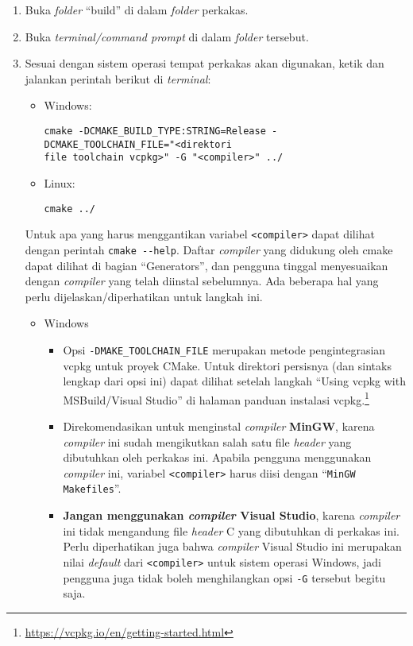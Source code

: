 \begin{enumerate}
	\item Buka \textit{folder} ``build'' di dalam \textit{folder} perkakas.
	\item Buka \textit{terminal/command prompt} di dalam \textit{folder} tersebut.
	\item Sesuai dengan sistem operasi tempat perkakas akan digunakan, ketik dan jalankan perintah berikut di \textit{terminal}:
	
	\begin{itemize}
		\item Windows:
		\begin{verbatim}
cmake -DCMAKE_BUILD_TYPE:STRING=Release -DCMAKE_TOOLCHAIN_FILE="<direktori
file toolchain vcpkg>" -G "<compiler>" ../
		\end{verbatim}
	
		\item Linux:
		\begin{verbatim}
cmake ../
		\end{verbatim}
	\end{itemize}		

	Untuk apa yang harus menggantikan variabel \verb|<compiler>| dapat dilihat dengan \mbox{perintah} \verb|cmake --help|. Daftar \textit{compiler} yang didukung oleh cmake dapat dilihat di bagian \linebreak ``Generators'', dan pengguna tinggal menyesuaikan dengan \textit{compiler} yang telah diinstal sebelumnya.  Ada beberapa hal yang perlu dijelaskan/diperhatikan untuk langkah ini.
	
	\begin{itemize}
		\item Windows
			
		\begin{itemize}
			\item Opsi \verb|-DMAKE_TOOLCHAIN_FILE| merupakan metode pengintegrasian vcpkg untuk proyek CMake. Untuk direktori persisnya (dan sintaks lengkap dari opsi ini) dapat dilihat setelah langkah ``Using vcpkg with MSBuild/Visual Studio'' di halaman panduan instalasi vcpkg.\footnote{\href{https://vcpkg.io/en/getting-started.html}{https://vcpkg.io/en/getting-started.html}}
			\item Direkomendasikan untuk menginstal \textit{compiler} \textbf{MinGW}, karena \textit{compiler} ini sudah mengikutkan salah satu file \textit{header} yang dibutuhkan oleh perkakas ini. Apabila pengguna menggunakan \textit{compiler} ini, variabel \verb|<compiler>| harus diisi dengan ``\verb|MinGW Makefiles|''.
			\item \textbf{Jangan menggunakan \textit{compiler} Visual Studio}, karena \textit{compiler} ini tidak mengandung file \textit{header} C yang dibutuhkan di perkakas ini. Perlu diperhatikan juga bahwa \textit{compiler} Visual Studio ini merupakan nilai \textit{default} dari \verb|<compiler>| untuk sistem operasi Windows, jadi pengguna juga tidak boleh menghilangkan opsi \verb|-G| tersebut begitu saja.
		\end{itemize}
		

\end{itemize}
\end{enumerate}
